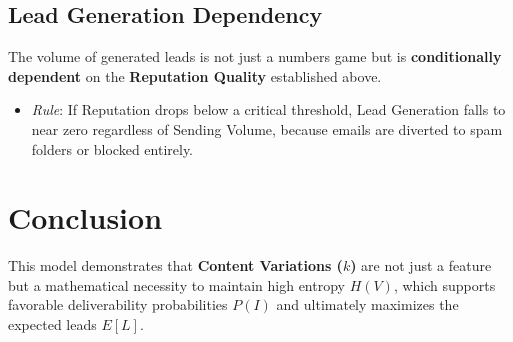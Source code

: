 \documentclass{article}
\begin{document}
\subsection{Lead Generation Dependency}
The volume of generated leads is not just a numbers game but is \textbf{conditionally dependent} on the \textbf{Reputation Quality} established above.
\begin{itemize}
    \item \textit{Rule}: If Reputation drops below a critical threshold, Lead Generation falls to near zero regardless of Sending Volume, because emails are diverted to spam folders or blocked entirely.
\end{itemize}

\section{Conclusion}
This model demonstrates that \textbf{Content Variations ($k$)} are not just a feature but a mathematical necessity to maintain high entropy $H(V)$, which supports favorable deliverability probabilities $P(I)$ and ultimately maximizes the expected leads $E[L]$.
\end{document}
